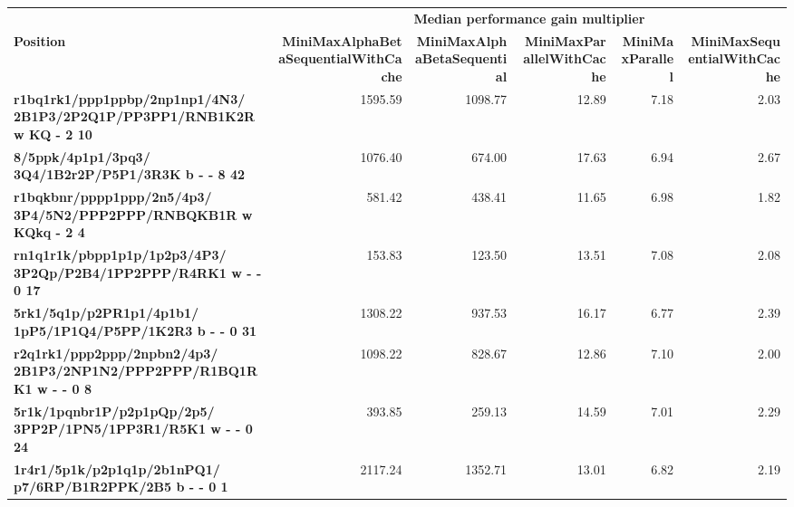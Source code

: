 \begin{tabular}{|p{8cm}|*{5}{r|}}
    \hline
    & \multicolumn{5}{c|}{\textbf{Median performance gain multiplier}} \\
    \cline{2-6}
    \multirow{-2}{*}{\parbox{8cm}{\centering\textbf{Position}}}                     & \multicolumn{1}{r|}{\textbf{MiniMaxAlphaBetaSequentialWithCache}} & \multicolumn{1}{r|}{\textbf{MiniMaxAlphaBetaSequential}} & \multicolumn{1}{r|}{\textbf{MiniMaxParallelWithCache}} & \multicolumn{1}{r|}{\textbf{MiniMaxParallel}} & \multicolumn{1}{r|}{\textbf{MiniMaxSequentialWithCache}} \\
    \hline
    \rowcolor[HTML]{FFFFFF}
    \textbf{r1bq1rk1/ppp1ppbp/2np1np1/4N3/ 2B1P3/2P2Q1P/PP3PP1/RNB1K2R w KQ - 2 10} & 1595.59 & 1098.77 & 12.89 & 7.18 & 2.03 \\

    \rowcolor[HTML]{EFEFEF}
    \textbf{8/5ppk/4p1p1/3pq3/ 3Q4/1B2r2P/P5P1/3R3K b - - 8 42}                     & 1076.40                                                           & 674.00                                                   & 17.63 & 6.94 & 2.67 \\

    \rowcolor[HTML]{FFFFFF}
    \textbf{r1bqkbnr/pppp1ppp/2n5/4p3/ 3P4/5N2/PPP2PPP/RNBQKB1R w KQkq - 2 4}       & 581.42 & 438.41 & 11.65 & 6.98 & 1.82 \\

    \rowcolor[HTML]{EFEFEF}
    \textbf{rn1q1r1k/pbpp1p1p/1p2p3/4P3/ 3P2Qp/P2B4/1PP2PPP/R4RK1 w - - 0 17}       & 153.83 & 123.50 & 13.51 & 7.08 & 2.08 \\

    \rowcolor[HTML]{FFFFFF}
    \textbf{5rk1/5q1p/p2PR1p1/4p1b1/ 1pP5/1P1Q4/P5PP/1K2R3 b - - 0 31}              & 1308.22                                                           & 937.53 & 16.17 & 6.77 & 2.39 \\

    \rowcolor[HTML]{EFEFEF}
    \textbf{r2q1rk1/ppp2ppp/2npbn2/4p3/ 2B1P3/2NP1N2/PPP2PPP/R1BQ1RK1 w - - 0 8}    & 1098.22 & 828.67 & 12.86 & 7.10 & 2.00 \\

    \rowcolor[HTML]{FFFFFF}
    \textbf{5r1k/1pqnbr1P/p2p1pQp/2p5/ 3PP2P/1PN5/1PP3R1/R5K1 w - - 0 24}           & 393.85                                                            & 259.13 & 14.59 & 7.01 & 2.29 \\

    \rowcolor[HTML]{EFEFEF}
    \textbf{1r4r1/5p1k/p2p1q1p/2b1nPQ1/ p7/6RP/B1R2PPK/2B5 b - - 0 1}               & 2117.24                                                           & 1352.71 & 13.01 & 6.82 & 2.19 \\


\end{tabular}
